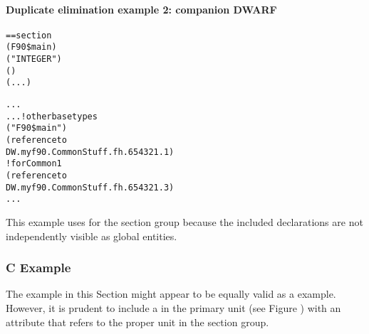 \paragraph{Duplicate elimination example 2: companion DWARF }
\label{app:duplicateeliminationexample2companiondwarf}

\begin{alltt}
== section 
        (F90\$main)
            ("INTEGER")
            ()
            (...)

            ...
        ...  ! other base types
            ("F90\$main")
                (reference to
                    DW.myf90.CommonStuff.fh.654321.1)
             ! for Common1
                (reference to
                    DW.myf90.CommonStuff.fh.654321.3)
            ...
\end{alltt}


This example uses  for the section group
because the included declarations are not independently
visible as global entities.


\subsubsection{C Example}

The  example in this Section might appear to be equally
valid as a  example. However, it is prudent to include
a 
in the primary unit 
(see Figure )
with an  attribute that refers to the proper unit
in the section group.

